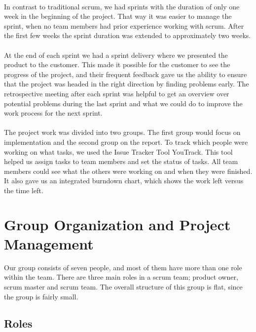 \paragraph{} In contrast to traditional scrum, we had sprints with the duration of only one week in the beginning of the project. That way it was easier to manage the sprint, when no team members had prior experience working with scrum. After the first few weeks the sprint duration was extended to approximately two weeks. 

\paragraph{} At the end of each sprint we had a sprint delivery where we presented the product to the customer. This made it possible for the customer to see the progress of the project, and their frequent feedback gave us the ability to ensure that the project was headed in the right direction by finding problems early. The retrospective meeting after each sprint was helpful to get an overview over potential problems during the last sprint and what we could do to improve the work process for the next sprint. 

\paragraph{} The project work was divided into two groups. The first group would focus on implementation and the second group on the report. To track which people were working on what tasks, we used the Issue Tracker Tool YouTrack. This tool helped us assign tasks to team members and set the status of tasks. All team members could see what the others were working on and when they were finished. It also gave us an integrated burndown chart, which shows the work left versus the time left.


\section{Group Organization and Project Management}
\label{sec:PlanningGroupOrg}
Our group consists of seven people, and most of them have more than one role within the team. There are three main roles in a scrum team; product owner, scrum master and scrum team. The overall structure of this group is flat, since the group is fairly small.

\subsection{Roles}
\label{subsec:PlanningGroupOrgRoles}
